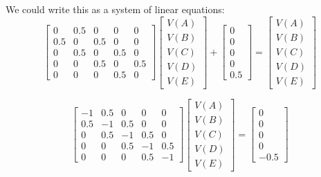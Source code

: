 We could write this as a system of linear equations:
\[
\begin{bmatrix}
    0 & 0.5 & 0 & 0 & 0 \\
    0.5 & 0 & 0.5 & 0 & 0 \\
    0 & 0.5 & 0 & 0.5 & 0 \\
    0 & 0 & 0.5 & 0 & 0.5 \\
    0 & 0 & 0 & 0.5 & 0 
\end{bmatrix}
\begin{bmatrix}
    V(A) \\
    V(B) \\
    V(C) \\
    V(D) \\
    V(E) 
\end{bmatrix}
+
\begin{bmatrix}
    0 \\
    0 \\
    0 \\
    0 \\
    0.5
\end{bmatrix}
=
\begin{bmatrix}
    V(A) \\
    V(B) \\
    V(C) \\
    V(D) \\
    V(E) 
\end{bmatrix}
\]

\[
    \begin{bmatrix}
        -1 & 0.5 & 0 & 0 & 0 \\
        0.5 & -1 & 0.5 & 0 & 0 \\
        0 & 0.5 & -1 & 0.5 & 0 \\
        0 & 0 & 0.5 & -1 & 0.5 \\
        0 & 0 & 0 & 0.5 & -1 
    \end{bmatrix}
    \begin{bmatrix}
        V(A) \\
        V(B) \\
        V(C) \\
        V(D) \\
        V(E) 
    \end{bmatrix}
    =
    \begin{bmatrix}
        0 \\
        0 \\
        0 \\
        0 \\
        -0.5
    \end{bmatrix}
\]

